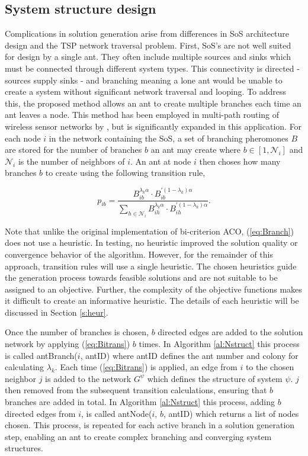 \documentclass[preprint,12pt,authoryear]{elsarticle}
\begin{document}
\subsection{System structure design}

Complications in solution generation arise from differences in SoS architecture design and the TSP network traversal problem. First, SoS's are not well suited for design by a single ant. They often include multiple sources and sinks which must be connected through different system types. This connectivity is directed - sources supply sinks - and branching meaning a lone ant would be unable to create a system without significant network traversal and looping. To address this, the proposed method allows an ant to create multiple branches each time an ant leaves a node. This method has been employed in multi-path routing of wireless sensor networks by \cite{Yang2010}, but is significantly expanded in this application. For each node $i$ in the network containing the SoS, a set of branching pheromones $B$ are stored for the number of branches $b$ an ant may create where $b \in [1,\mathcal{N}_i]$ and $\mathcal{N}_i$ is the number of neighbors of $i$. An ant at node $i$ then choses how many branches $b$ to create using the following transition rule,

\begin{equation}
p_{ib}=\frac{B_{ib}^{\lambda_k\alpha}\cdot B_{ib}^{'(1-\lambda_k)\alpha}}{\sum_{h\in\mathcal{N}_i}B_{ih}^{\lambda_k\alpha}\cdot B_{ih}^{'(1-\lambda_k)\alpha}}.
\label{eq:Branch}
\end{equation}

\noindent Note that unlike the original implementation of bi-criterion ACO, (\ref{eq:Branch}) does not use a heuristic. In testing, no heuristic improved the solution quality or convergence behavior of the algorithm. However, for the remainder of this approach, transition rules will use a single heuristic. The chosen heuristics guide the generation process towards feasible solutions and are not suitable to be assigned to an objective. Further, the complexity of the objective functions makes it difficult to create an informative heuristic. The details of each heuristic will be discussed in Section \ref{s:heur}. 

Once the number of branches is chosen, $b$ directed edges are added to the solution network by applying (\ref{eq:Bitrans}) $b$ times. In Algorithm \ref{al:Nstruct} this process is called antBranch($i$, antID) where antID defines the ant number and colony for calculating $\lambda_k$. Each time (\ref{eq:Bitrans}) is applied, an edge from $i$ to the chosen neighbor $j$ is added to the network $G^\psi$ which defines the structure of system $\psi$. $j$ then removed from the subsequent transition calculations, ensuring that $b$ branches are added in total. In Algorithm \ref{al:Nstruct} this process, adding $b$ directed edges from $i$, is called antNode($i$, $b$, antID) which returns a list of nodes chosen. This process, is repeated for each active branch in a solution generation step, enabling an ant to create complex branching and converging system structures. 
\end{document}
